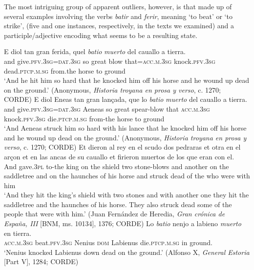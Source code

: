 \documentclass[output=paper,colorlinks,citecolor=brown,
]{langscibook}
\begin{document}
 The most intriguing group of apparent outliers, however, is that made up of several examples involving the verbs \textit{batir} and \textit{ferir}, meaning ‘to beat’ or `to strike', (five and one instances, respectively, in the texts we examined) and a participle/adjective encoding what seems to be a resulting state.

\ea\label{ex:acedomatellan:batir+ADJ}
  \ea
    \gll E diol tan gran ferida, quel \textit{batio} \textit{muerto} del cauallo a tierra.\\
and give.\textsc{pfv}.\textsc{3sg}=\textsc{dat}.\textsc{3sg} so great blow that=\textsc{acc}.\textsc{m}.\textsc{3sg} knock.\textsc{pfv}.\textsc{3sg} dead.\textsc{ptcp.}\textsc{m}.\textsc{sg} from.the horse to ground\\
    \glt `And he hit him so hard that he knocked him off his horse and he wound up dead on the ground.’ (Anonymous, \textit{Historia troyana en prosa y verso}, c. 1270; CORDE)
  \ex
    \gll E diol Eneas tan gran lançada, que lo \textit{batio} \textit{muerto} del cauallo a tierra.\\
and give.\textsc{pfv}.\textsc{3sg}=\textsc{dat}.\textsc{3sg} Aeneas so great spear-blow that \textsc{acc}.\textsc{m}.\textsc{3sg} knock.\textsc{pfv}.\textsc{3sg} die.\textsc{ptcp}.\textsc{m}.\textsc{sg} from-the horse to ground\\
    \glt `And Aeneas struck him so hard with his lance that he knocked him off his horse and he wound up dead on the ground.’ (Anonymous, \textit{Historia troyana en prosa y verso}, c. 1270; CORDE)
  \ex
    \gll Et dieron al rey en el scudo dos pedraras et otra en el arçon et en las ancas de su cauallo et firieron muertos de los que eran con el.\\
And gave.\textsc{3pl} to-the king on the shield two stone-blows and another on the saddletree and on the haunches of his horse and struck dead of the who were with him \\
    \glt `And they hit the king's shield with two stones and with another one they hit the saddletree and the haunches of his horse. They also struck dead some of the people that were with him.’ (Juan Fernández de Heredia, \textit{Gran crónica de España, III} [BNM, ms. 10134], 1376; CORDE)
  \ex\label{ex:acedomatellan:nenjo}
    \gll Lo \textit{batio} nenjo a labieno \textit{muerto} en tierra.  \\
\textsc{acc}.\textsc{m}.\textsc{3sg} beat.\textsc{pfv}.\textsc{3sg} Nenius \textsc{dom} Labienus die.\textsc{ptcp}.\textsc{m}.\textsc{sg} in ground.\\
    \glt `Nenius knocked Labienus down dead on the ground.’ (Alfonso X, \textit{General Estoria} [Part V], 1284; CORDE)
  \z 
\z 
\end{document}
